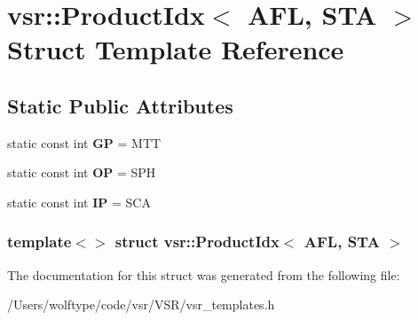 \hypertarget{structvsr_1_1_product_idx_3_01_a_f_l_00_01_s_t_a_01_4}{\section{vsr\-:\-:Product\-Idx$<$ A\-F\-L, S\-T\-A $>$ Struct Template Reference}
\label{structvsr_1_1_product_idx_3_01_a_f_l_00_01_s_t_a_01_4}
}
\subsection*{Static Public Attributes}
\begin{DoxyCompactItemize}
\item 
\hypertarget{structvsr_1_1_product_idx_3_01_a_f_l_00_01_s_t_a_01_4_a1c07bf287bbdc9a111126511ab388001}{static const int {\bfseries G\-P} = M\-T\-T}\label{structvsr_1_1_product_idx_3_01_a_f_l_00_01_s_t_a_01_4_a1c07bf287bbdc9a111126511ab388001}

\item 
\hypertarget{structvsr_1_1_product_idx_3_01_a_f_l_00_01_s_t_a_01_4_a582cd6cc56b4b6e6889778cd428533ff}{static const int {\bfseries O\-P} = S\-P\-H}\label{structvsr_1_1_product_idx_3_01_a_f_l_00_01_s_t_a_01_4_a582cd6cc56b4b6e6889778cd428533ff}

\item 
\hypertarget{structvsr_1_1_product_idx_3_01_a_f_l_00_01_s_t_a_01_4_a07bb91d0a73dfd725529a4bdbbfe575b}{static const int {\bfseries I\-P} = S\-C\-A}\label{structvsr_1_1_product_idx_3_01_a_f_l_00_01_s_t_a_01_4_a07bb91d0a73dfd725529a4bdbbfe575b}

\end{DoxyCompactItemize}
\subsubsection*{template$<$$>$ struct vsr\-::\-Product\-Idx$<$ A\-F\-L, S\-T\-A $>$}



The documentation for this struct was generated from the following file\-:\begin{DoxyCompactItemize}
\item 
/\-Users/wolftype/code/vsr/\-V\-S\-R/vsr\-\_\-templates.\-h\end{DoxyCompactItemize}
